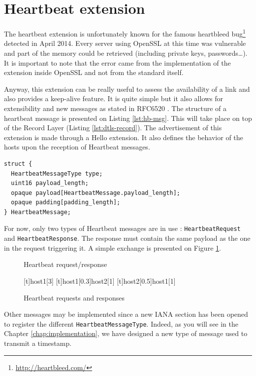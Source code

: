 
\section{Heartbeat extension}

The heartbeat extension is unfortunately known for the famous heartbleed bug\footnote{\url{http://heartbleed.com/}} detected in April 2014. Every server using OpenSSL at this time was vulnerable and part of the memory could be retrieved (including private keys, passwords\dots). It is important to note that the error came from the implementation of the extension inside OpenSSL and not from the standard itself.

Anyway, this extension can be really useful to assess the availability of a link and also provides a keep-alive feature. It is quite simple but it also allows for extensibility and new messages as stated in RFC6520 \cite{rfc6520}. The structure of a heartbeat message is presented on Listing \ref{lst:hb-msg}. This will take place on top of the Record Layer (Listing \ref{lst:dtls-record}). The advertisement of this extension is made through a Hello extension. It also defines the behavior of the hosts upon the reception of Heartbeat messages.

\begin{lstlisting}[caption=Heartbeat message, label=lst:hb-msg]
struct {
  HeartbeatMessageType type;
  uint16 payload_length;
  opaque payload[HeartbeatMessage.payload_length];
  opaque padding[padding_length];
} HeartbeatMessage;
\end{lstlisting}

For now, only two types of Heartbeat messages are in use : \texttt{HeartbeatRequest} and \texttt{HeartbeatResponse}. The response must contain the same payload as the one in the request triggering it. A simple exchange is presented on Figure \ref{fig:heartbeat}.

\begin{figure}[!h]
\centering
\begin{msc}[r]{Heartbeat request/response}

\setlength{\instfootheight}{0em}
\setlength{\instheadheight}{0em}
\setlength{\instdist}{0.7\linewidth}
\setlength{\levelheight}{3em}


[t]{}{host1}[3]
\nextlevel
{}[t]{host1}[0.3]{host2}[1]
\nextlevel
{}[t]{host2}[0.5]{host1}[1]
\nextlevel
\nextlevel
\end{msc}
\caption{Heartbeat requests and responses}
\label{fig:heartbeat}
\end{figure}

Other messages may be implemented since a new IANA section has been opened to register the different \texttt{HeartbeatMessageType}. Indeed, as you will see in the Chapter \ref{chap:implementation}, we have designed a new type of message used to transmit a timestamp.
